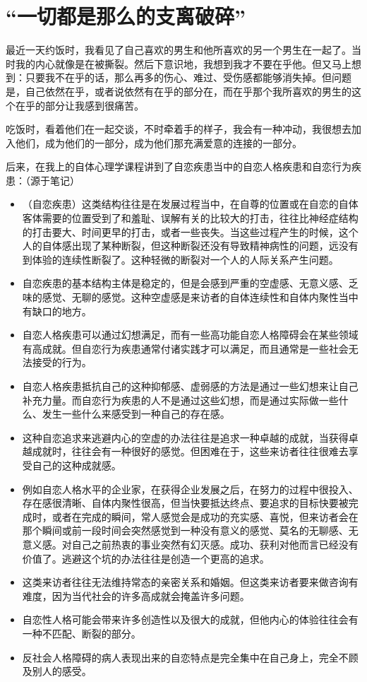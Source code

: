\chapter{“一切都是那么的支离破碎”}




最近一天约饭时，我看见了自己喜欢的男生和他所喜欢的另一个男生在一起了。当时我的内心就像是在被撕裂。然后下意识地，我想到我才不要在乎他。但又马上想到：只要我不在乎的话，那么再多的伤心、难过、受伤感都能够消失掉。但问题是，自己依然在乎，或者说依然有在乎的部分在，而在乎那个我所喜欢的男生的这个在乎的部分让我感到很痛苦。

吃饭时，看着他们在一起交谈，不时牵着手的样子，我会有一种冲动，我很想去加入他们，成为他们的一部分，成为他们那充满爱意的连接的一部分。

后来，在我上的自体心理学课程讲到了自恋疾患当中的自恋人格疾患和自恋行为疾患：（源于笔记）

\begin{itemize}
	\item （自恋疾患）这类结构往往是在发展过程当中，在自尊的位置或在自恋的自体客体需要的位置受到了和羞耻、误解有关的比较大的打击，往往比神经症结构的打击要大、时间更早的打击，或者一些丧失。当这些过程产生的时候，这个人的自体感出现了某种断裂，但这种断裂还没有导致精神病性的问题，远没有到体验的连续性断裂了。这种轻微的断裂对一个人的人际关系产生问题。
	\item 自恋疾患的基本结构主体是稳定的，但是会感到严重的空虚感、无意义感、乏味的感觉、无聊的感觉。这种空虚感是来访者的自体连续性和自体内聚性当中有缺口的地方。
	\item 自恋人格疾患可以通过幻想满足，而有一些高功能自恋人格障碍会在某些领域有高成就。但自恋行为疾患通常付诸实践才可以满足，而且通常是一些社会无法接受的行为。
	\item 自恋人格疾患抵抗自己的这种抑郁感、虚弱感的方法是通过一些幻想来让自己补充力量。而自恋行为疾患的人不是通过这些幻想，而是通过实际做一些什么、发生一些什么来感受到一种自己的存在感。
	\item 这种自恋追求来逃避内心的空虚的办法往往是追求一种卓越的成就，当获得卓越成就时，往往会有一种很好的感觉。但困难在于，这些来访者往往很难去享受自己的这种成就感。
	\item 例如自恋人格水平的企业家，在获得企业发展之后，在努力的过程中很投入、存在感很清晰、自体内聚性很高，但当快要抵达终点、要追求的目标快要被完成时，或者在完成的瞬间，常人感觉会是成功的充实感、喜悦，但来访者会在那个瞬间或前一段时间会突然感觉到一种没有意义的感觉、莫名的无聊感、无意义感。对自己之前热衷的事业突然有幻灭感。成功、获利对他而言已经没有价值了。逃避这个坑的办法往往是创造一个更高的追求。
	\item 这类来访者往往无法维持常态的亲密关系和婚姻。但这类来访者要来做咨询有难度，因为当代社会的许多高成就会掩盖许多问题。
	\item 自恋性人格可能会带来许多创造性以及很大的成就，但他内心的体验往往会有一种不匹配、断裂的部分。
	\item 反社会人格障碍的病人表现出来的自恋特点是完全集中在自己身上，完全不顾及别人的感受。
\end{itemize}

